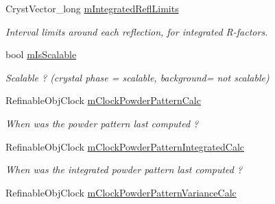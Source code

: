 \begin{DoxyCompactItemize}
Cryst\+Vector\+\_\+long \mbox{\hyperlink{class_obj_cryst_1_1_powder_pattern_component_ad0441f62b3b16e18f7cbdda6d89432cb}{m\+Integrated\+Refl\+Limits}}
\begin{DoxyCompactList}\small\item\em Interval limits around each reflection, for integrated R-\/factors. \end{DoxyCompactList}\item 
\mbox{\label{class_obj_cryst_1_1_powder_pattern_component_aa1729b95ee7b6fbdc3e6aa7a9ca94aad}} 
bool \mbox{\hyperlink{class_obj_cryst_1_1_powder_pattern_component_aa1729b95ee7b6fbdc3e6aa7a9ca94aad}{m\+Is\+Scalable}}
\begin{DoxyCompactList}\small\item\em Scalable ? (crystal phase = scalable, background= not scalable) \end{DoxyCompactList}\item 
\mbox{\label{class_obj_cryst_1_1_powder_pattern_component_aa64deb96cf54c504d9a24cdf209e9e0e}} 
Refinable\+Obj\+Clock \mbox{\hyperlink{class_obj_cryst_1_1_powder_pattern_component_aa64deb96cf54c504d9a24cdf209e9e0e}{m\+Clock\+Powder\+Pattern\+Calc}}
\begin{DoxyCompactList}\small\item\em When was the powder pattern last computed ? \end{DoxyCompactList}\item 
\mbox{\label{class_obj_cryst_1_1_powder_pattern_component_adc8435a9476962ad2876a8cfbee5cde5}} 
Refinable\+Obj\+Clock \mbox{\hyperlink{class_obj_cryst_1_1_powder_pattern_component_adc8435a9476962ad2876a8cfbee5cde5}{m\+Clock\+Powder\+Pattern\+Integrated\+Calc}}
\begin{DoxyCompactList}\small\item\em When was the \textquotesingle{}integrated\textquotesingle{} powder pattern last computed ? \end{DoxyCompactList}\item 
\mbox{\label{class_obj_cryst_1_1_powder_pattern_component_a503f89c2087ebd815e5df69961efb148}} 
Refinable\+Obj\+Clock \mbox{\hyperlink{class_obj_cryst_1_1_powder_pattern_component_a503f89c2087ebd815e5df69961efb148}{m\+Clock\+Powder\+Pattern\+Variance\+Calc}}

\end{DoxyCompactItemize}
